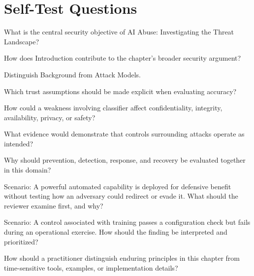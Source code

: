\documentclass[11pt,letterpaper]{article}
\begin{document}
\section*{Self-Test Questions}
\begin{CornellRecallList}
\item What is the central security objective of AI Abuse: Investigating the Threat Landscape?
\item How does Introduction contribute to the chapter's broader security argument?
\item Distinguish Background from Attack Models.
\item Which trust assumptions should be made explicit when evaluating accuracy?
\item How could a weakness involving classifier affect confidentiality, integrity, availability, privacy, or safety?
\item What evidence would demonstrate that controls surrounding attacks operate as intended?
\item Why should prevention, detection, response, and recovery be evaluated together in this domain?
\item Scenario: A powerful automated capability is deployed for defensive benefit without testing how an adversary could redirect or evade it. What should the reviewer examine first, and why?
\item Scenario: A control associated with training passes a configuration check but fails during an operational exercise. How should the finding be interpreted and prioritized?
\item How should a practitioner distinguish enduring principles in this chapter from time-sensitive tools, examples, or implementation details?
\end{CornellRecallList}
\end{document}
